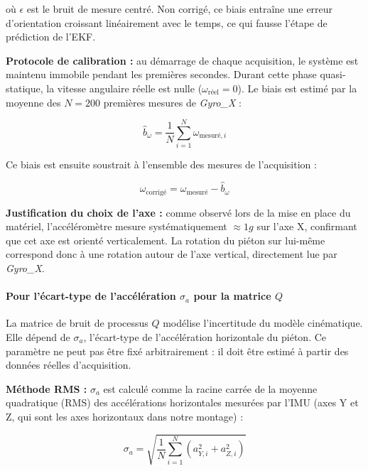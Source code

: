 où $\epsilon$ est le bruit de mesure centré. Non corrigé, ce biais entraîne
une erreur d'orientation croissant linéairement avec le temps, ce qui fausse
l'étape de prédiction de l'EKF.

\textbf{Protocole de calibration :} au démarrage de chaque acquisition, le
système est maintenu immobile pendant les premières secondes. Durant cette
phase quasi-statique, la vitesse angulaire réelle est nulle ($\omega_{\text{réel}} = 0$).
Le biais est estimé par la moyenne des $N = 200$ premières mesures de
\textit{Gyro\_X} :

\begin{equation}
    \hat{b}_\omega = \frac{1}{N} \sum_{i=1}^{N} \omega_{\text{mesuré},i}
\end{equation}

Ce biais est ensuite soustrait à l'ensemble des mesures de l'acquisition :

\begin{equation}
    \omega_{\text{corrigé}} = \omega_{\text{mesuré}} - \hat{b}_\omega
\end{equation}

\textbf{Justification du choix de l'axe :} comme observé lors de la mise en
place du matériel, l'accéléromètre mesure systématiquement $\approx 1g$ sur
l'axe X, confirmant que cet axe est orienté verticalement. La rotation du
piéton sur lui-même correspond donc à une rotation autour de l'axe vertical,
directement lue par \textit{Gyro\_X}.

\paragraph{Pour l'écart-type de l'accélération $\sigma_a$ pour la matrice $Q$}

La matrice de bruit de processus $Q$ modélise l'incertitude du modèle
cinématique. Elle dépend de $\sigma_a$, l'écart-type de l'accélération
horizontale du piéton. Ce paramètre ne peut pas être fixé arbitrairement :
il doit être estimé à partir des données réelles d'acquisition.

\textbf{Méthode RMS :} $\sigma_a$ est calculé comme la racine carrée de la
moyenne quadratique (RMS) des accélérations horizontales mesurées par l'IMU
(axes Y et Z, qui sont les axes horizontaux dans notre montage) :

\begin{equation}
    \sigma_a = \sqrt{\frac{1}{N} \sum_{i=1}^{N} \left( a_{Y,i}^2 + a_{Z,i}^2 \right)}
\end{equation}

